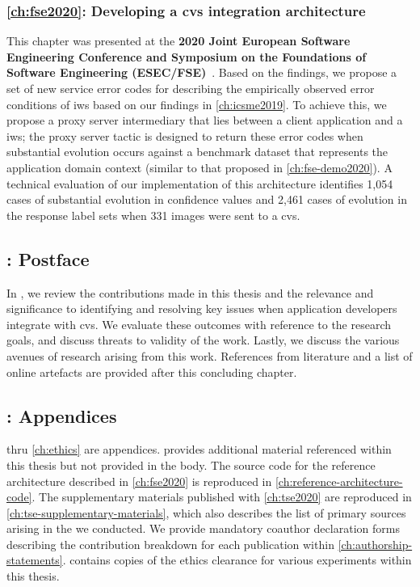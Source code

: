 \subsubsection{\cref{ch:fse2020}: Developing a \gls{cvs} integration architecture} This chapter was presented at the \textbf{2020 Joint European Software Engineering Conference and Symposium on the Foundations of Software Engineering (ESEC/FSE)}~\citep{Cummaudo:2020fse}. Based on the findings, we propose a set of new service error codes for describing the empirically observed error conditions of \gls{iws} based on our findings in \cref{ch:icsme2019}. To achieve this, we propose a proxy server intermediary that lies between a client application and a \gls{iws}; the proxy server tactic is designed to return these error codes when substantial evolution occurs against a benchmark dataset that represents the application domain context (similar to that proposed in \cref{ch:fse-demo2020}). A technical evaluation of our implementation of this architecture identifies 1,054 cases of substantial evolution in confidence values and 2,461 cases of evolution in the response label sets when 331 images were sent to a \gls{cvs}.

\subsection{: Postface}

In , we review the contributions made in this thesis and the relevance and significance to identifying and resolving key issues when application developers integrate with \gls{cvs}. We evaluate these outcomes with reference to the research goals, and discuss threats to validity of the work. Lastly, we discuss the various avenues of research arising from this work. References from literature and a list of online artefacts are provided after this concluding chapter.

\subsection{: Appendices}

 thru \cref{ch:ethics} are appendices.  provides additional material referenced within this thesis but not provided in the body. The source code for the reference architecture described in \cref{ch:fse2020} is reproduced in \cref{ch:reference-architecture-code}. The supplementary materials published with \cref{ch:tse2020} are reproduced in \cref{ch:tse-supplementary-materials}, which also describes the list of primary sources arising in the  we conducted.
 We provide mandatory coauthor declaration forms describing the contribution breakdown for each publication within \cref{ch:authorship-statements}.  contains copies of the ethics clearance for various experiments within this thesis. 

